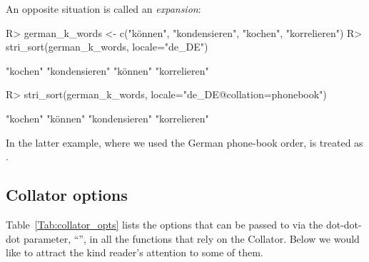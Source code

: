 \documentclass[nojss]{jss}
\begin{document}


An opposite situation is called an \textit{expansion}:

\begin{Schunk}
\begin{Sinput}
R> german_k_words <- c("können", "kondensieren", "kochen", "korrelieren")
R> stri_sort(german_k_words, locale="de_DE")
\end{Sinput}
\begin{Soutput}
[1] "kochen"       "kondensieren" "können"       "korrelieren"
\end{Soutput}
\begin{Sinput}
R> stri_sort(german_k_words, locale="de_DE@collation=phonebook")
\end{Sinput}
\begin{Soutput}
[1] "kochen"       "können"       "kondensieren" "korrelieren"
\end{Soutput}
\end{Schunk}


In the latter example, where we used the German phone-book order,
 is treated as .






\subsection{Collator options}\label{Sec:collator_opts}

Table~\ref{Tab:collator_opts} lists the options
that can be passed to  via the dot-dot-dot
parameter, ``'', in
all the functions that rely on the  Collator.
Below we would like to attract the kind reader's attention
to some of them.

\end{document}
